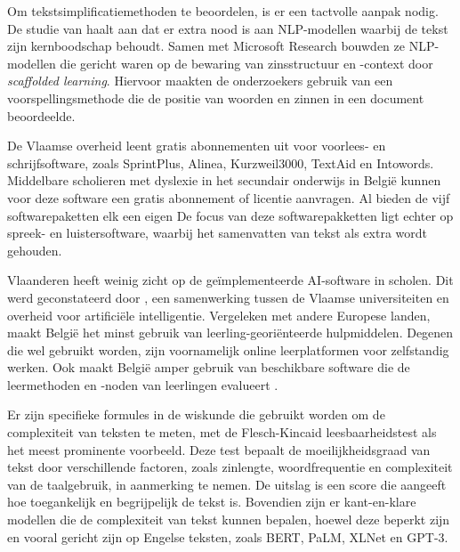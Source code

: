 Om tekstsimplificatiemethoden te beoordelen, is er een tactvolle aanpak nodig. De studie van \textcite{Swayamdipta2019} haalt aan dat er extra nood is aan NLP-modellen waarbij de tekst zijn kernboodschap behoudt. Samen met Microsoft Research bouwden ze NLP-modellen die gericht waren op de bewaring van zinsstructuur en -context door \emph{scaffolded learning}. Hiervoor maakten de onderzoekers gebruik van een voorspellingsmethode die de positie van woorden en zinnen in een document beoordeelde.

De Vlaamse overheid leent gratis abonnementen uit voor voorlees- en schrijfsoftware, zoals SprintPlus, Alinea, Kurzweil3000, TextAid en Intowords. Middelbare scholieren met dyslexie in het secundair onderwijs in België kunnen voor deze software een gratis abonnement of licentie aanvragen. Al bieden de vijf softwarepaketten elk een eigen De focus van deze softwarepakketten ligt echter op spreek- en luistersoftware, waarbij het samenvatten van tekst als extra wordt gehouden.

Vlaanderen heeft weinig zicht op de geïmplementeerde AI-software in scholen. Dit werd geconstateerd door \autocite{Martens2021}, een samenwerking tussen de Vlaamse universiteiten en overheid voor artificiële intelligentie. Vergeleken met andere Europese landen, maakt België het minst gebruik van leerling-georiënteerde hulpmiddelen. Degenen die wel gebruikt worden, zijn voornamelijk online leerplatformen voor zelfstandig werken. Ook maakt België amper gebruik van beschikbare software die de leermethoden en -noden van leerlingen evalueert \autocite{Martens2021a}. 




Er zijn specifieke formules in de wiskunde die gebruikt worden om de complexiteit van teksten te meten, met de Flesch-Kincaid leesbaarheidstest als het meest prominente voorbeeld. Deze test bepaalt de moeilijkheidsgraad van tekst door verschillende factoren, zoals zinlengte, woordfrequentie en complexiteit van de taalgebruik, in aanmerking te nemen. De uitslag is een score die aangeeft hoe toegankelijk en begrijpelijk de tekst is. Bovendien zijn er kant-en-klare modellen die de complexiteit van tekst kunnen bepalen, hoewel deze beperkt zijn en vooral gericht zijn op Engelse teksten, zoals BERT, PaLM, XLNet en GPT-3.

